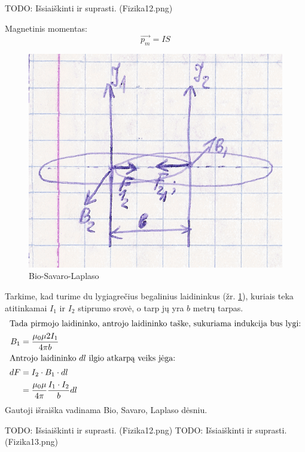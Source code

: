 TODO: Išsiaiškinti ir suprasti. (Fizika12.png)

Magnetinis momentas:
\begin{equation*}
  \vec{p_{m}} = IS
\end{equation*}

\begin{figure}[H]
  \begin{center}
    \includegraphics[height=0.5\textwidth]{images/bio_savaro_laplaso.png}
  \end{center}
  \caption{Bio-Savaro-Laplaso}
  \label{fig:bio_savaro_laplaso}
\end{figure}

\begin{defn}
  Tarkime, kad turime du lygiagrečius begalinius laidininkus (žr.
  \ref{fig:bio_savaro_laplaso}), kuriais teka atitinkamai $I_{1}$
  ir $I_{2}$ stiprumo srovė, o tarp jų yra $b$ metrų tarpas.
  \begin{align*}
    \intertext{Tada pirmojo laidininko, antrojo laidininko taške,
    sukuriama indukcija bus lygi:}
    B_{1} &= \frac{\mu_{0}\mu 2 I_{1}}{4 \pi b} \\
    \intertext{Antrojo laidininko $dl$ ilgio atkarpą veiks jėga:}
    dF
    &= I_{2} \cdot B_{1} \cdot dl \\
    &= \frac{\mu_{0}\mu}{4 \pi} \frac{I_{1}\cdot I_{2}}{b} dl \\
  \end{align*}
  Gautoji išraiška vadinama Bio, Savaro, Laplaso dėsniu.
\end{defn}

TODO: Išsiaiškinti ir suprasti. (Fizika12.png)
TODO: Išsiaiškinti ir suprasti. (Fizika13.png)

